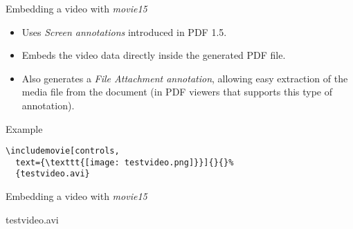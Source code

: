 \documentclass{beamer}
\begin{document}
\begin{frame}[fragile]{Embedding a video with \emph{movie15}}{}
  \begin{block}{}
    \begin{itemize}
      \item Uses \emph{Screen annotations} introduced in PDF 1.5.
      \item Embeds the video data directly inside the generated
            PDF file.
      \item Also generates a \emph{File Attachment annotation},
            allowing easy extraction of the media file from the
            document (in PDF viewers that supports this type of
            annotation).
    \end{itemize}
  \end{block}

  \begin{block}{Example}
    \begin{verbatim}
\includemovie[controls,
  text={\texttt{[image: testvideo.png]}}]{}{}%
  {testvideo.avi}
    \end{verbatim}
  \end{block}
\end{frame}

\begin{frame}{Embedding a video with \emph{movie15}}{}
  \begin{block}{}
    \begin{center}
        {testvideo.avi}
    \end{center}
  \end{block}
\end{frame}
\end{document}
